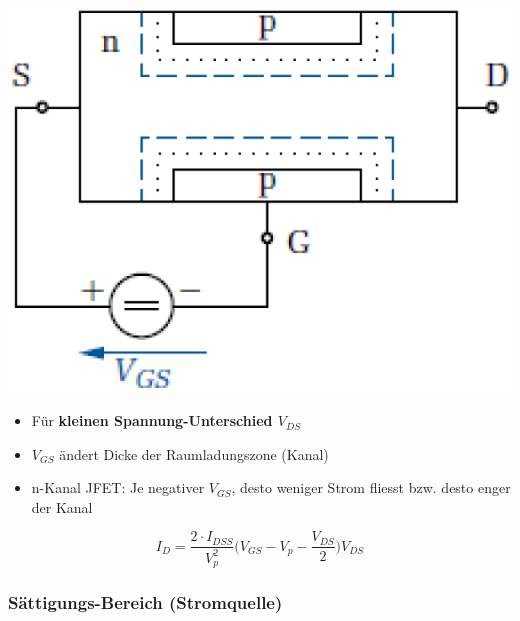     \begin{minipage}[t]{0.3\columnwidth}
        \includegraphics[align=t, width=\columnwidth]{images/fet_aufbau_linearer_bereich.png}
    \end{minipage}
    \hfill
    \begin{minipage}[t]{0.68\columnwidth}
        \begin{itemize}
            \item Für \textbf{kleinen Spannung-Unterschied $V_{DS}$}
            \item $V_{GS}$ ändert Dicke der Raumladungszone (Kanal)
            \item n-Kanal JFET: Je negativer $V_{GS}$, desto weniger Strom fliesst bzw. desto enger der Kanal
        \end{itemize}

        $$ I_D = \frac{2 \cdot I_{DSS}}{V_p^2} \Big( V_{GS} - V_p - \frac{V_{DS}}{2} \Big) V_{DS} $$
    \end{minipage}


\subsubsection{Sättigungs-Bereich (Stromquelle)}


